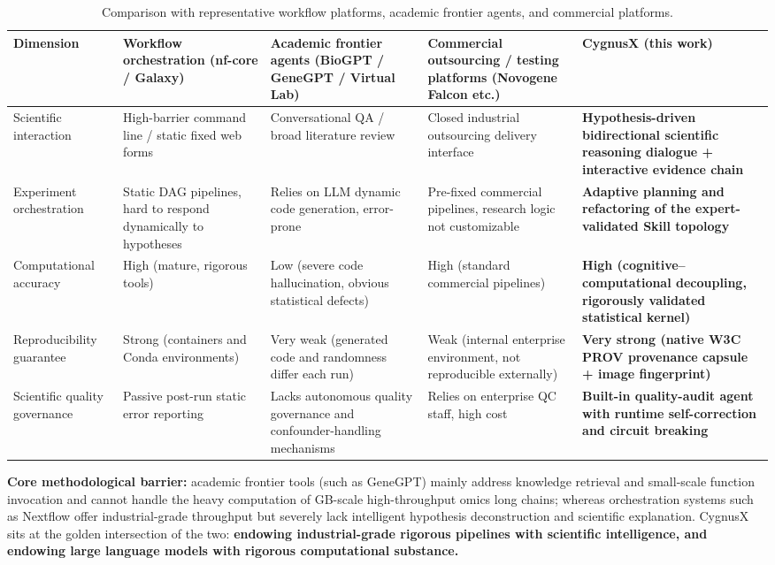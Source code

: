 \documentclass[11pt,a4paper]{article}
\begin{document}
\begin{table}[htbp]
\centering
\renewcommand{\arraystretch}{1.25}
\footnotesize
\begin{tabularx}{\textwidth}{p{}X X X X}
\toprule
\textbf{Dimension} & \textbf{Workflow orchestration (nf-core / Galaxy)} & \textbf{Academic frontier agents (BioGPT / GeneGPT / Virtual Lab)} & \textbf{Commercial outsourcing / testing platforms (Novogene Falcon etc.)} & \textbf{CygnusX (this work)}\\
\midrule
Scientific interaction & High-barrier command line / static fixed web forms & Conversational QA / broad literature review & Closed industrial outsourcing delivery interface & \textbf{Hypothesis-driven bidirectional scientific reasoning dialogue + interactive evidence chain}\\
Experiment orchestration & Static DAG pipelines, hard to respond dynamically to hypotheses & Relies on LLM dynamic code generation, error-prone & Pre-fixed commercial pipelines, research logic not customizable & \textbf{Adaptive planning and refactoring of the expert-validated Skill topology}\\
Computational accuracy & High (mature, rigorous tools) & Low (severe code hallucination, obvious statistical defects) & High (standard commercial pipelines) & \textbf{High (cognitive--computational decoupling, rigorously validated statistical kernel)}\\
Reproducibility guarantee & Strong (containers and Conda environments) & Very weak (generated code and randomness differ each run) & Weak (internal enterprise environment, not reproducible externally) & \textbf{Very strong (native W3C PROV provenance capsule + image fingerprint)}\\
Scientific quality governance & Passive post-run static error reporting & Lacks autonomous quality governance and confounder-handling mechanisms & Relies on enterprise QC staff, high cost & \textbf{Built-in quality-audit agent with runtime self-correction and circuit breaking}\\
\bottomrule
\end{tabularx}
\caption{Comparison with representative workflow platforms, academic frontier agents, and commercial platforms.}
\end{table}

\textbf{Core methodological barrier:} academic frontier tools (such as GeneGPT) mainly address knowledge retrieval and small-scale function invocation and cannot handle the heavy computation of GB-scale high-throughput omics long chains; whereas orchestration systems such as Nextflow offer industrial-grade throughput but severely lack intelligent hypothesis deconstruction and scientific explanation. CygnusX sits at the golden intersection of the two: \textbf{endowing industrial-grade rigorous pipelines with scientific intelligence, and endowing large language models with rigorous computational substance.}
\end{document}
